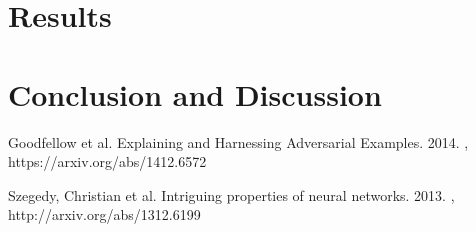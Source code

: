 \documentclass[twoside,twocolumn]{article}
\begin{document}
\section{Results}




\section{Conclusion and Discussion}






\begin{thebibliography}{99} %

Goodfellow et al.
\newblock Explaining and Harnessing Adversarial Examples. 2014.
, https://arxiv.org/abs/1412.6572

Szegedy, Christian et al.
\newblock Intriguing properties of neural networks. 2013.
, http://arxiv.org/abs/1312.6199
 

 
 
\end{thebibliography}

\end{document}
